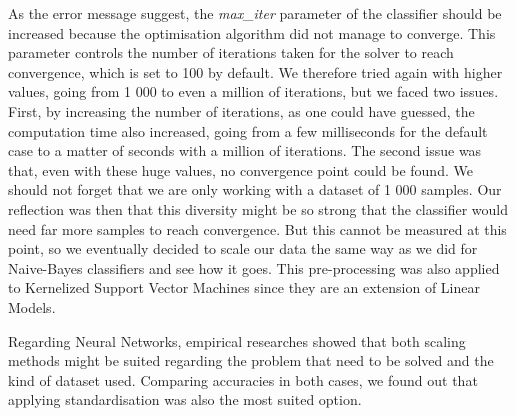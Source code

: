 As the error message suggest, the \textit{max\_iter} parameter of the classifier should be increased because the optimisation algorithm did not manage to converge. This parameter controls the number of iterations taken for the solver to reach convergence, which is set to 100 by default. We therefore tried again with higher values, going from 1 000 to even a million of iterations, but we faced two issues. First, by increasing the number of iterations, as one could have guessed, the computation time also increased, going from a few milliseconds for the default case to a matter of seconds with a million of iterations. The second issue was that, even with these huge values, no convergence point could be found. We should not forget that we are only working with a dataset of 1 000 samples.
Our reflection was then that this diversity might be so strong that the classifier would need far more samples to reach convergence. But this cannot be measured at this point, so we eventually decided to scale our data the same way as we did for Naive-Bayes classifiers and see how it goes. This pre-processing was also applied to Kernelized Support Vector Machines since they are an extension of Linear Models.

Regarding Neural Networks, empirical researches showed that both scaling methods might be suited regarding the problem that need to be solved and the kind of dataset used. Comparing accuracies in both cases, we found out that applying standardisation was also the most suited option.

